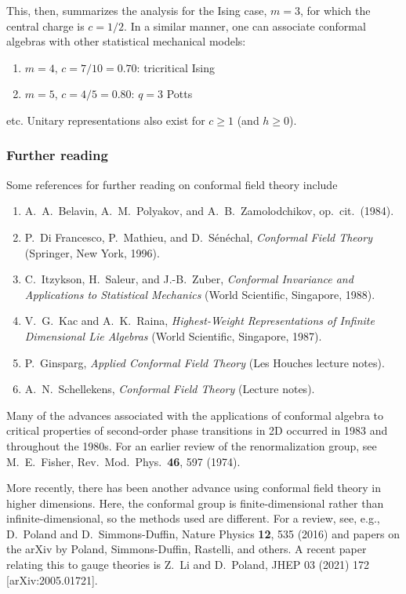 This, then, summarizes the analysis for the Ising case, $m = 3$, for which the central charge is $c = 1/2$. In a
similar manner, one can associate conformal algebras with other statistical mechanical models:
\begin{enumerate}[nosep]
  \item $m = 4$, $c = 7/10 = 0.70$: tricritical Ising
  \item $m = 5$, $c = 4/5 = 0.80$: $q = 3$ Potts
\end{enumerate}
etc. Unitary representations also exist for $c\ge1$ (and $h\ge0$).

\subsubsection*{Further reading}

Some references for further reading on conformal field theory include
\begin{enumerate}[nosep]
  \item A.~A.~Belavin, A.~M.~Polyakov, and A.~B.~Zamolodchikov, op.\ cit.\ (1984).
  \item P.~Di Francesco, P.~Mathieu, and D.~S\'en\'echal, \emph{Conformal Field Theory} (Springer, New York, 1996).
  \item C.~Itzykson, H.~Saleur, and J.-B.~Zuber, \emph{Conformal Invariance and Applications to Statistical
    Mechanics} (World Scientific, Singapore, 1988).
  \item V.~G.~Kac and A.~K.~Raina, \emph{Highest-Weight Representations of Infinite Dimensional Lie Algebras}
    (World Scientific, Singapore, 1987).
  \item P.~Ginsparg, \emph{Applied Conformal Field Theory} (Les Houches lecture notes).
  \item A.~N.~Schellekens, \emph{Conformal Field Theory} (Lecture notes).
\end{enumerate}

Many of the advances associated with the applications of conformal algebra to critical properties of second-order
phase transitions in 2D occurred in 1983 and throughout the 1980s. For an earlier review of the renormalization group,
see M.~E.~Fisher, Rev.\ Mod.\ Phys.\ \textbf{46}, 597 (1974).

More recently, there has been another advance using conformal field theory in higher dimensions. Here, the conformal
group is finite-dimensional rather than infinite-dimensional, so the methods used are different. For a review, see,
e.g., D.~Poland and D.~Simmons-Duffin, Nature Physics \textbf{12}, 535 (2016) and papers on the arXiv by Poland,
Simmons-Duffin, Rastelli, and others. A recent paper relating this to gauge theories is Z.~Li and D.~Poland, JHEP 03
(2021) 172 [arXiv:2005.01721].
